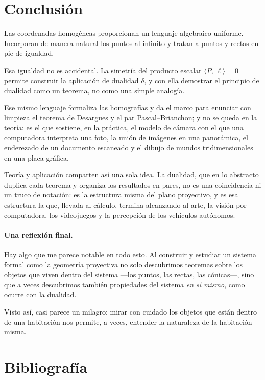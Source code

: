 \documentclass[11pt,a4paper]{article}
\newcommand{\inc}[2]{\langle #1,\, #2\rangle}
\begin{document}
\section{Conclusión}

Las coordenadas homogéneas proporcionan un lenguaje algebraico uniforme.
Incorporan de manera natural los puntos al infinito y tratan a puntos y
rectas en pie de igualdad.

Esa igualdad no es accidental. La simetría del producto escalar
$\inc{P}{\ell}=0$ permite construir la aplicación de dualidad $\delta$, y
con ella demostrar el principio de dualidad como un teorema, no como una
simple analogía.

Ese mismo lenguaje formaliza las homografías y da el marco para enunciar
con limpieza el teorema de Desargues y el par Pascal--Brianchon; y no se
queda en la teoría: es el que sostiene, en la práctica, el modelo de
cámara con el que una computadora interpreta una foto, la unión de
imágenes en una panorámica, el enderezado de un documento escaneado y el
dibujo de mundos tridimensionales en una placa gráfica.

Teoría y aplicación comparten así una sola idea. La dualidad, que en lo
abstracto duplica cada teorema y organiza los resultados en pares, no es
una coincidencia ni un truco de notación: es la estructura misma del plano
proyectivo, y es esa estructura la que, llevada al cálculo, termina
alcanzando al arte, la visión por computadora, los videojuegos y la
percepción de los vehículos autónomos.

\paragraph{Una reflexión final.}
Hay algo que me parece notable en todo esto. Al construir y estudiar un
sistema formal como la geometría proyectiva no solo descubrimos teoremas
sobre los objetos que viven dentro del sistema —los puntos, las rectas,
las cónicas—, sino que a veces descubrimos también propiedades del sistema
\emph{en sí mismo}, como ocurre con la dualidad.

Visto así, casi parece un milagro: mirar con cuidado los objetos que están
dentro de una habitación nos permite, a veces, entender la naturaleza de
la habitación misma.

\section*{Bibliografía}
\end{document}
